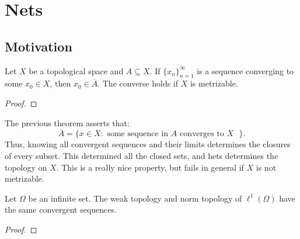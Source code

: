 \section{Nets}

\subsection{Motivation}

\begin{theorem}
	Let $X$ be a topological space and $A \subseteq X$. If $\{x_n\}_{n = 1}^\infty$ is a sequence converging to some $x_0 \in X$, then $x_0 \in \overline{A}$. The converse holds if $X$ is metrizable.
\end{theorem}
	{\color{red}
	\begin{proof}
			
	\end{proof}}

\begin{remark}
	The previous theorem asserts that:
	\[
		\overline{A} = \{x \in X : \text{ some sequence in $A$ converges to $X$ }\}.
	\] 
	Thus, knowing all convergent sequences and their limits determines the closures of every subset. This determined all the closed sets, and hets determines the topology on $X$. This is a really nice property, but fails in general if $X$ is not metrizable.
\end{remark}

\begin{theorem}
	Let $\Omega$ be an infinite set. The weak topology and norm topology of $\ell^1(\Omega)$ have the same convergent sequences.
\end{theorem}
	{\color{red}
	\begin{proof}
			
	\end{proof}}

